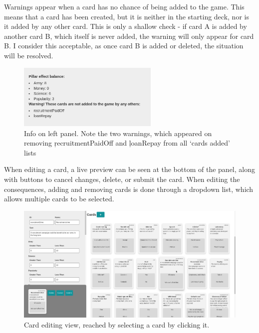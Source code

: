 Warnings appear when a card has no chance of being added to the game. This means that a card has been created, but it is neither in the starting deck, nor is it added by any other card. This is only a shallow check - if card A is added by another card B, which itself is never added, the warning will only appear for card B. I consider this acceptable, as once card B is added or deleted, the situation will be resolved.

\begin{figure}[!h]
	\centering
	\includegraphics[width=0.6\textwidth]{./images/design/info.png}
	\caption{Info on left panel. Note the two warnings, which appeared on removing \c{recruitmentPaidOff} and \c{loanRepay} from all `cards added' lists}
	\label{fig:info}
\end{figure}

When editing a card, a live preview can be seen at the bottom of the panel, along with buttons to cancel changes, delete, or submit the card. When editing the consequences, adding and removing cards is done through a dropdown list, which allows multiple cards to be selected.

\begin{figure}[!h]
	\centering
	\includegraphics[width=1.0\textwidth]{./images/design/card_edit.png}
	\caption{Card editing view, reached by selecting a card by clicking it.}
	\label{fig:card_edit}
\end{figure}

